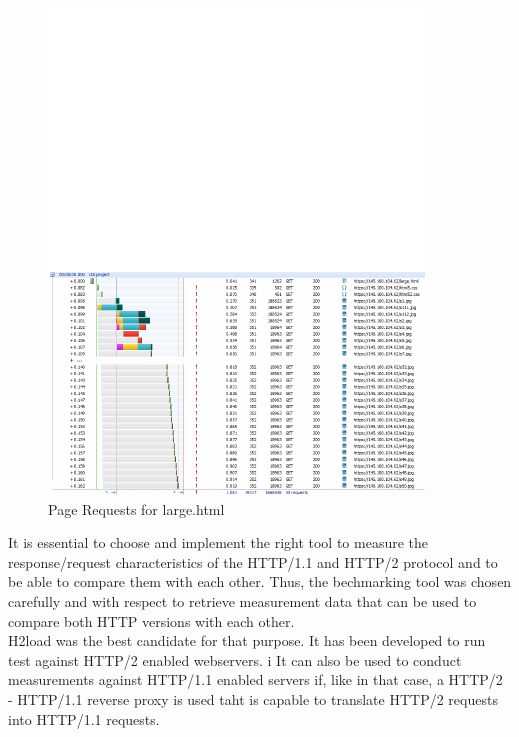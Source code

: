 \begin{figure}[H]
	\centering
	\includegraphics[scale=2]{images/http.pdf}
	\caption{Page Requests for large.html}
	\label{fig:httpwatch}
\end{figure}
  

It is essential to choose and implement the right tool to measure the response/request characteristics of the HTTP/1.1 and HTTP/2 protocol and to be able to compare them with each other. Thus, the bechmarking tool was chosen carefully and with respect to retrieve measurement data that can be used to compare both HTTP versions with each other. 
\\
H2load \cite{h2load} was the best candidate for that purpose. It has been developed to run test against HTTP/2 enabled webservers. i
It can also be used to conduct measurements against HTTP/1.1 enabled servers if, like in that case, a HTTP/2 - HTTP/1.1 reverse proxy is used taht is capable to translate HTTP/2 requests into HTTP/1.1 requests.    
